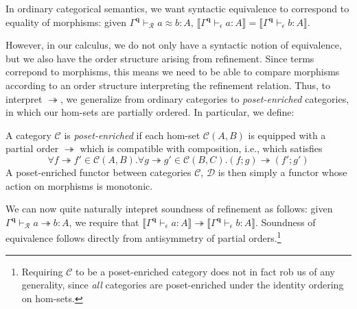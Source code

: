 \documentclass[acmsmall,screen,review]{acmart}
\newcommand{\mc}[1]{\ensuremath{\mathcal{#1}}}
\newcommand{\mb}[1]{\ensuremath{\mathbf{#1}}}
\newcommand{\hasty}[4]{#1 \vdash_{#2} #3: {#4}}
\newcommand{\teqv}{\approx}
\newcommand{\tref}{\twoheadrightarrow}
\newcommand{\cref}{\twoheadrightarrow}
\newcommand{\tmle}[5]{#1 \vdash_{#2} #3 \tref #4 : {#5}}
\newcommand{\tmeq}[5]{#1 \vdash_{#2} #3 \teqv #4 : {#5}}
\newcommand{\dnt}[1]{\llbracket{#1}\rrbracket}
\begin{document}
In ordinary categorical semantics, we want syntactic equivalence to
correspond to equality of morphisms: given $\tmeq{\Gamma^{\mb{q}}}{\mc{R}}{a}{b}{A}$,
$\dnt{\hasty{\Gamma^{\mb{q}}}{\epsilon}{a}{A}} = \dnt{\hasty{\Gamma^{\mb{q}}}{\epsilon}{b}{A}}$. 

However, in our calculus, we do not only have a syntactic notion of equivalence, but we also have
the order structure arising from refinement. Since terms correpond to morphisms, this means we need
to be able to compare morphisms according to an order structure interpreting the refinement
relation. Thus, to interpret $\tref$, we generalize from ordinary categories to
\emph{poset-enriched} categories, in which our hom-sets are partially ordered. In particular, we
define:

\begin{definition}
  A category $\mc{C}$ is \emph{poset-enriched} if each hom-set $\mc{C}(A, B)$ is equipped with a
  partial order $\cref$ which is compatible with composition, i.e., which satisfies
  $$
  \forall f \cref f' \in \mc{C}(A, B) . \forall g \tref g' \in \mc{C}(B, C) . 
    (f ; g) \tref (f' ; g')
  $$
  A poset-enriched functor between categories $\mc{C}$, $\mc{D}$ is then simply a functor whose
  action on morphisms is monotonic.
\end{definition}

We can now quite naturally intepret soundness of refinement as follows: given
$\tmle{\Gamma^{\mb{q}}}{\mc{R}}{a}{b}{A}$, we require that
$\dnt{\hasty{\Gamma^{\mb{q}}}{\epsilon}{a}{A}} \cref \dnt{\hasty{\Gamma^{\mb{q}}}{\epsilon}{b}{A}}$.
Soundness of equivalence follows directly from antisymmetry of partial orders.\footnote{Requiring
$\mc{C}$ to be a poset-enriched category does not in fact rob us of any generality, since \emph{all}
categories are poset-enriched under the identity ordering on hom-sets.}
\end{document}
